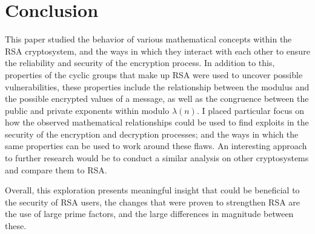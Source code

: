 \section{Conclusion}
\label{sec:section7}
This paper studied the behavior of various mathematical concepts within the RSA cryptosystem, and the ways in which they interact with each other to ensure the reliability and security of the encryption process. In addition to this, properties of the cyclic groups that make up RSA were used to uncover possible vulnerabilities, these properties include the relationship between the modulus and the possible encrypted values of a message, as well as the congruence between the public and private exponents within modulo $\lambda (n)$. I placed particular focus on how the observed mathematical relationships could be used to find exploits in the security of the encryption and decryption processes; and the ways in which the same properties can be used to work around these flaws. An interesting approach to further research would be to conduct a similar analysis on other cryptosystems and compare them to RSA.

Overall, this exploration presents meaningful insight that could be beneficial to the security of RSA users, the changes that were proven to strengthen RSA are the use of large prime factors, and the large differences in magnitude between these. 

